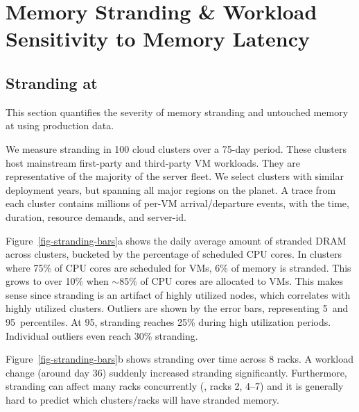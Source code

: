 

\section{Memory Stranding \& Workload Sensitivity to Memory Latency}
\label{sec:measurements}

\subsection{Stranding at \azure}
\label{sec-strand}

This section quantifies the severity of memory stranding
and untouched memory at \azure using production data.

 We measure stranding in 100 cloud clusters over a
75-day period.  These clusters host mainstream first-party and third-party VM workloads.
They are representative of the majority of the server fleet.
We select clusters with similar deployment years, but spanning all major
regions on the planet. A trace from each cluster contains millions of per-VM
arrival/departure events, with the time, duration, resource demands, and
server-id.



%



 Figure~\ref{fig-stranding-bars}a shows the
daily average amount of stranded
DRAM across clusters, bucketed by the percentage of scheduled CPU cores.
In clusters where 75\% of CPU cores are scheduled for VMs, 6\%
of memory is stranded. This grows to over 10\% when $\sim$85\% of CPU
cores are allocated to VMs. This makes sense since stranding is an
artifact of highly utilized nodes, which correlates with highly utilized
clusters.
%
Outliers are shown by the error bars, representing 5\th\ and 95\th\
percentiles. At 95\th, stranding reaches 25\% during high utilization
periods. Individual outliers even reach 30\% stranding.

Figure~\ref{fig-stranding-bars}b shows stranding over time across 8
racks. A workload change (around day 36)
suddenly increased stranding significantly.  Furthermore, stranding can
affect many racks concurrently (\eg, racks 2, 4--7) and it is generally
hard to predict which clusters\slash racks will have stranded memory.
%

